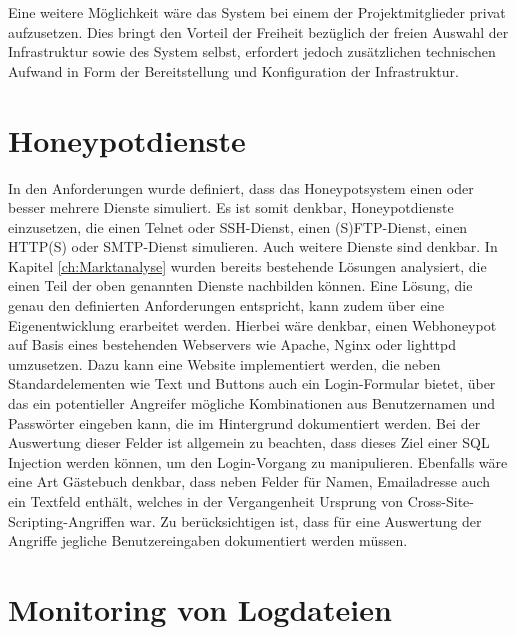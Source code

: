 Eine weitere Möglichkeit wäre das System bei einem der Projektmitglieder privat aufzusetzen. Dies bringt den Vorteil der Freiheit bezüglich der freien Auswahl der Infrastruktur sowie des System selbst, erfordert jedoch zusätzlichen technischen Aufwand in Form der Bereitstellung und Konfiguration der Infrastruktur.\\


\section{Honeypotdienste}
\label{sec:Honeypotdienste}


In den Anforderungen wurde definiert, dass das Honeypotsystem einen oder besser mehrere Dienste simuliert.  Es ist somit denkbar, Honeypotdienste einzusetzen, die einen Telnet oder SSH-Dienst, einen (S)FTP-Dienst, einen HTTP(S) oder SMTP-Dienst simulieren. Auch weitere Dienste sind denkbar. In Kapitel \ref{ch:Marktanalyse} wurden bereits bestehende Lösungen analysiert, die einen Teil der oben genannten Dienste nachbilden können.
Eine Lösung, die genau den definierten Anforderungen entspricht, kann zudem über eine Eigenentwicklung erarbeitet werden. Hierbei wäre denkbar, einen Webhoneypot auf Basis eines bestehenden Webservers wie Apache, Nginx oder lighttpd umzusetzen. Dazu kann eine Website implementiert werden, die neben Standardelementen wie Text und Buttons auch ein Login-Formular bietet, über das ein potentieller Angreifer mögliche Kombinationen aus Benutzernamen und Passwörter eingeben kann, die im Hintergrund dokumentiert werden. Bei der Auswertung dieser Felder ist allgemein zu beachten, dass dieses Ziel einer SQL Injection werden können, um den Login-Vorgang zu manipulieren. Ebenfalls wäre eine Art Gästebuch denkbar, dass neben Felder für Namen, Emailadresse auch ein Textfeld enthält, welches in der Vergangenheit Ursprung von Cross-Site-Scripting-Angriffen war. Zu berücksichtigen ist, dass für eine Auswertung der Angriffe jegliche Benutzereingaben dokumentiert werden müssen.


\section{Monitoring von Logdateien}
\label{sec:Monitoring von Logdateien}

